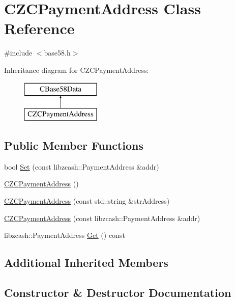 \hypertarget{class_c_z_c_payment_address}{}\section{C\+Z\+C\+Payment\+Address Class Reference}
\label{class_c_z_c_payment_address}


{\ttfamily \#include $<$base58.\+h$>$}

Inheritance diagram for C\+Z\+C\+Payment\+Address\+:\begin{figure}[H]
\begin{center}
\leavevmode
\includegraphics[height=2.000000cm]{class_c_z_c_payment_address}
\end{center}
\end{figure}
\subsection*{Public Member Functions}
\begin{DoxyCompactItemize}
\item 
bool \mbox{\hyperlink{class_c_z_c_payment_address_aa89a4517ba16d1d559d7bd534e8471d0}{Set}} (const libzcash\+::\+Payment\+Address \&addr)
\item 
\mbox{\hyperlink{class_c_z_c_payment_address_a9eb9bc36437547e7f0ed79f18389f06d}{C\+Z\+C\+Payment\+Address}} ()
\item 
\mbox{\hyperlink{class_c_z_c_payment_address_a72fd927fbc6322cdeff45d6cb209afae}{C\+Z\+C\+Payment\+Address}} (const std\+::string \&str\+Address)
\item 
\mbox{\hyperlink{class_c_z_c_payment_address_acf0b08d31e9cb6b1a1862b54340b65ec}{C\+Z\+C\+Payment\+Address}} (const libzcash\+::\+Payment\+Address \&addr)
\item 
libzcash\+::\+Payment\+Address \mbox{\hyperlink{class_c_z_c_payment_address_a95f7c38361637df85674897b473f3e3f}{Get}} () const
\end{DoxyCompactItemize}
\subsection*{Additional Inherited Members}


\subsection{Constructor \& Destructor Documentation}
\mbox{\label{class_c_z_c_payment_address_a9eb9bc36437547e7f0ed79f18389f06d}} 
